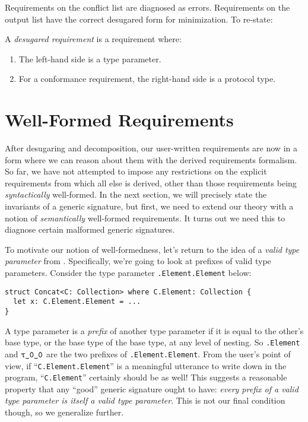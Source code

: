 \documentclass[../generics]{subfiles}
\begin{document}
Requirements on the conflict list are diagnosed as errors. Requirements on the output list have the correct desugared form for minimization. To re-state:
\begin{definition}\label{desugaredrequirementdef}
A \emph{desugared requirement} is a requirement where:
\begin{enumerate}
\item The left-hand side is a type parameter.
\item For a conformance requirement, the right-hand side is a protocol type.
\end{enumerate}
\end{definition}

\section{Well-Formed Requirements}\label{generic signature validity}

After desugaring and decomposition, our user-written requirements are now in a form where we can reason about them with the derived requirements formalism. So far, we have not attempted to impose any restrictions on the explicit requirements from which all else is derived, other than those requirements being \emph{syntactically} well-formed. In the next section, we will precisely state the invariants of a generic signature, but first, we need to extend our theory with a notion of \emph{semantically} well-formed requirements. It turns out we need this to diagnose certain malformed generic signatures.

To motivate our notion of well-formedness, let's return to the idea of a \emph{valid type parameter} from . Specifically, we're going to look at prefixes of valid type parameters. Consider the type parameter \texttt{\rT.Element.Element} below:
\begin{Verbatim}
struct Concat<C: Collection> where C.Element: Collection {
  let x: C.Element.Element = ...
}
\end{Verbatim}

A type parameter is a \emph{prefix} of another type parameter if it is equal to the other's base type, or the base type of the base type, at any level of nesting. So \texttt{\rT.Element} and $\rT$ are the two prefixes of \texttt{\rT.Element.Element}. From the user's point of view, if ``\texttt{C.Element.Element}'' is a meaningful utterance to write down in the program, ``\texttt{C.Element}'' certainly should be as well! This suggests a reasonable property that any ``good'' generic signature ought to have: \textsl{every prefix of a valid type parameter is itself a valid type parameter}. This is not our final condition though, so we generalize further.
\end{document}
